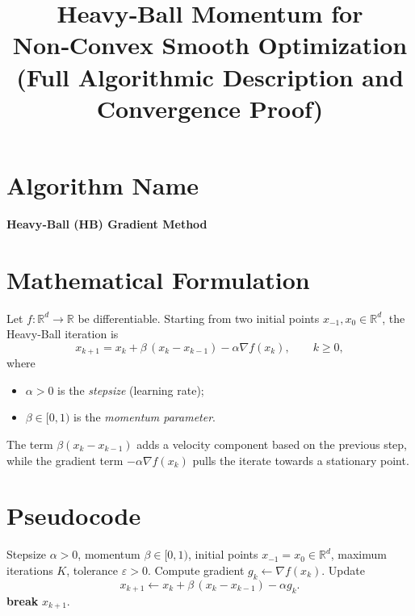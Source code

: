 \documentclass[11pt]{article}
\newcommand{\R}{\mathbb{R}}
\begin{document}
\title{Heavy‑Ball Momentum for Non‑Convex Smooth Optimization\\
(Full Algorithmic Description and Convergence Proof)}
\author{}
\date{}
\maketitle

\tableofcontents
\newpage

\section*{Algorithm Name}
\begin{center}
\textbf{Heavy‑Ball (HB) Gradient Method}
\end{center}
\section*{Mathematical Formulation}
Let $f:\R^{d}\rightarrow\R$ be differentiable.  Starting from two initial points 
$x_{-1},x_{0}\in\R^{d}$, the Heavy‑Ball iteration is
\begin{equation}
\boxed{
x_{k+1}=x_{k}+\beta\,(x_{k}-x_{k-1})-\alpha \nabla f(x_{k}),\qquad k\ge 0,
}
\label{eq:HB}
\end{equation}
where
\begin{itemize}
    \item $\alpha>0$ is the \emph{stepsize} (learning rate);
    \item $\beta\in[0,1)$ is the \emph{momentum parameter}.
\end{itemize}
The term $\beta(x_{k}-x_{k-1})$ adds a velocity component based on the previous
step, while the gradient term $-\alpha\nabla f(x_{k})$ pulls the iterate towards a
stationary point.

\section*{Pseudocode}
\begin{algorithm}[H]
\caption{Heavy‑Ball Gradient Method}
\begin{algorithmic}[1]
\Require Stepsize $\alpha>0$, momentum $\beta\in[0,1)$, 
initial points $x_{-1}=x_{0}\in\R^{d}$, maximum iterations $K$,
tolerance $\varepsilon>0$.
    \State Compute gradient $g_{k}\gets\nabla f(x_{k})$.
    \State Update 
    \[
    x_{k+1}\gets x_{k}+\beta\,(x_{k}-x_{k-1})-\alpha g_{k}.
    \]
        \State \textbf{break}
    \EndIf
\EndFor
\State \Return $x_{k+1}$.
\end{algorithmic}
\end{algorithm}
\end{document}
